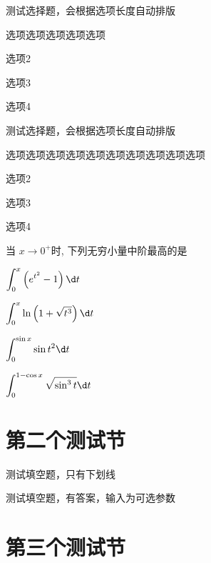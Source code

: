 \begin{exercise}
  测试选择题，会根据选项长度自动排版 \paren
  \begin{choices}
    \item 选项选项选项选项选项
    \item 选项2
    \item 选项3
    \item 选项4
  \end{choices}
\end{exercise}

\begin{exercise}
  测试选择题，会根据选项长度自动排版 \paren
  \begin{choices}
    \item 选项选项选项选项选项选项选项选项选项选项
    \item 选项2
    \item 选项3
    \item 选项4
  \end{choices}
\end{exercise}

\begin{exercise}
  当 $x \rightarrow 0^{+}$时, 下列无穷小量中阶最高的是 \paren
  \begin{choices}
    \item $\displaystyle \int_0^x\left(e^{t^2}-1\right) \d t$
    \item $\displaystyle\int_0^x \ln \left(1+\sqrt{t^3}\right) \d t$
    \item $\displaystyle\int_0^{\sin x} \sin t^2 \d t$
    \item $\displaystyle\int_0^{1-\cos x} \sqrt{\sin^3 t} \d t$
  \end{choices}
\end{exercise}



\section{第二个测试节}

\begin{exercise}
  测试填空题，只有下划线 \fillin
\end{exercise}

\begin{exercise}
  测试填空题，有答案，输入为可选参数 \fillin[我是答案]
\end{exercise}



\section{第三个测试节}

